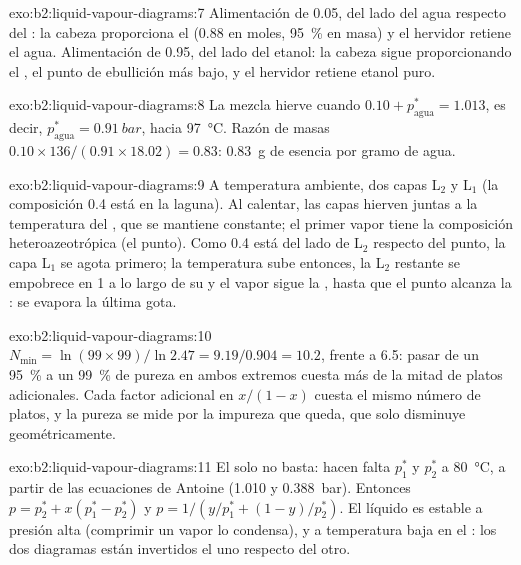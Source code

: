 \begin{solution}{exo:b2:liquid-vapour-diagrams:7}
Alimentación de 0.05, del lado del agua respecto del : la cabeza proporciona el 
(0.88 en moles, 95~\% en masa) y el hervidor retiene el agua. Alimentación de 0.95, del lado
del etanol: la cabeza sigue proporcionando el , el punto de ebullición más bajo,
y el hervidor retiene etanol puro.
\end{solution}

\begin{solution}{exo:b2:liquid-vapour-diagrams:8}
La mezcla hierve cuando $0.10 + p^*_{\text{agua}} = 1.013$, es decir,
$p^*_{\text{agua}} = \qty{0.91}{bar}$, hacia \qty{97}{\degreeCelsius}. Razón de masas
$0.10 \times 136/(0.91 \times 18.02) = 0.83$: \qty{0.83}{g} de esencia por gramo
de agua.
\end{solution}

\begin{solution}{exo:b2:liquid-vapour-diagrams:9}
A temperatura ambiente, dos capas L$_2$ y L$_1$ (la composición 0.4 está en la
laguna). Al calentar, las capas hierven juntas a la temperatura del ,
que se mantiene constante; el primer vapor tiene la composición
heteroazeotrópica (el punto). Como 0.4 está del lado de L$_2$ respecto del punto, la capa
L$_1$ se agota primero; la temperatura sube entonces, la L$_2$ restante se
empobrece en 1 a lo largo de su  y el vapor sigue la , hasta
que el punto alcanza la : se evapora la última gota.
\end{solution}

\begin{solution}{exo:b2:liquid-vapour-diagrams:10}
$N_{\min} = \ln(99 \times 99)/\ln 2.47 = 9.19/0.904 = 10.2$, frente a 6.5: pasar
de un 95~\% a un 99~\% de pureza en ambos extremos cuesta más de la mitad de platos
adicionales. Cada factor adicional en $x/(1 - x)$ cuesta el mismo número de platos, y
la pureza se mide por la impureza que queda, que solo disminuye geométricamente.
\end{solution}

\begin{solution}{exo:b2:liquid-vapour-diagrams:11}
El  solo no basta: hacen falta $p_1^*$ y $p_2^*$ a
\qty{80}{\degreeCelsius}, a partir de las ecuaciones de Antoine (1.010 y
\qty{0.388}{bar}). Entonces $p = p_2^* + x(p_1^* - p_2^*)$ y $p = 1/(y/p_1^* + (1 -
y)/p_2^*)$. El líquido es estable a presión alta (comprimir un vapor
lo condensa), y a temperatura baja en el : los dos diagramas
están invertidos el uno respecto del otro.
\end{solution}

